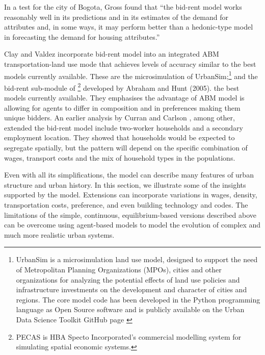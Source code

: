In a test for the city of Bogota, Gross \cite{grossEstimatingWillingnessPay1988} found that ``the bid-rent model works reasonably well in its predictions and in its estimates of the demand for attributes and, in some ways, it may perform better than a hedonic-type model in forecasting the demand for housing attributes.'' 

Clay and Valdez incorporate bid-rent model into an integrated ABM transportation-land use mode that achieves levels of accuracy similar to the best models currently available. These are the microsimulation of UrbanSim;\footnote{UrbanSim is a microsimulation land use model, designed to support the need of Metropolitan Planning Organizations (MPOs), cities and other organizations for analyzing the potential effects of land use policies and infrastructure investments on the development and character of cities and regions. The core model code has been developed in the Python programming language as Open Source software and is publicly available on the Urban Data Science Toolkit GitHub page \cite{waddellmodellinurbandev2002}} and the bid-rent sub-module of \footnote{PECAS is  HBA Specto Incorporated's commercial modelling system  for simulating spatial economic systems.} developed by Abraham and Hunt (2005). the best models currently available. They emphasises the advantage of ABM model is allowing for agents to differ in composition and in preferences making them unique bidders. 
An earlier analysis by Curran and Carlson \cite{curranTheoryResidentialLocation1982}, among other, extended the bid-rent model include two-worker households and a secondary employment location. They showed that households would be expected to segregate spatially, but the pattern will depend on the specific combination of wages, transport costs and the mix of household types in the populations. 

Even with all its simplifications, the model can describe many features of urban structure and urban history. In this section, we illustrate some of the insights supported by the model. Extensions can incorporate variations in wages, density, transportation costs, preference, and even building technology and codes. The limitations of the simple, continuous, equilibrium-based versions described above can be overcome using agent-based models to model the evolution of complex and much more realistic urban systems. 


